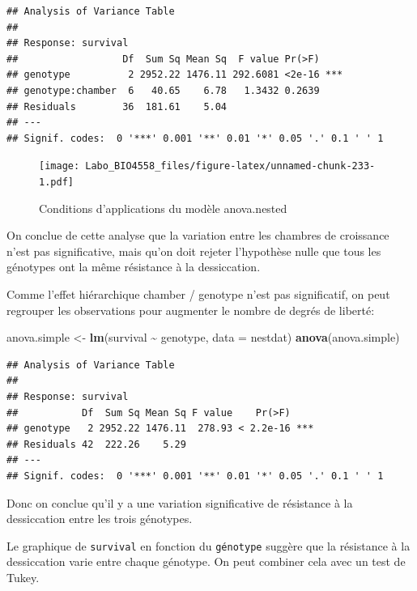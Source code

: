 \documentclass[
  12pt,
]{book}
\newenvironment{Shaded}{\begin{snugshade}}{\end{snugshade}}
\newcommand{\DataTypeTok}[1]{\textcolor[rgb]{0.13,0.29,0.53}{#1}}
\newcommand{\KeywordTok}[1]{\textcolor[rgb]{0.13,0.29,0.53}{\textbf{#1}}}
\newcommand{\NormalTok}[1]{#1}
\newcommand{\OperatorTok}[1]{\textcolor[rgb]{0.81,0.36,0.00}{\textbf{#1}}}
\newcommand{\StringTok}[1]{\textcolor[rgb]{0.31,0.60,0.02}{#1}}
\begin{document}
\begin{verbatim}
## Analysis of Variance Table
## 
## Response: survival
##                  Df  Sum Sq Mean Sq  F value Pr(>F)    
## genotype          2 2952.22 1476.11 292.6081 <2e-16 ***
## genotype:chamber  6   40.65    6.78   1.3432 0.2639    
## Residuals        36  181.61    5.04                    
## ---
## Signif. codes:  0 '***' 0.001 '**' 0.01 '*' 0.05 '.' 0.1 ' ' 1
\end{verbatim}

\begin{figure}
\centering
\texttt{[image: Labo\_BIO4558\_files/figure-latex/unnamed-chunk-233-1.pdf]}
\caption{\label{fig:unnamed-chunk-233}Conditions d'applications du modèle anova.nested}
\end{figure}

On conclue de cette analyse que la variation entre les chambres de croissance n'est pas significative, mais qu'on doit rejeter l'hypothèse nulle que tous les génotypes ont la même résistance à la dessiccation.

Comme l'effet hiérarchique chamber / genotype n'est pas significatif, on peut regrouper les observations pour augmenter le nombre de degrés de liberté:

\begin{Shaded}
\begin{Highlighting}[]
\NormalTok{anova.simple \textless{}{-}}\StringTok{ }\KeywordTok{lm}\NormalTok{(survival }\OperatorTok{\textasciitilde{}}\StringTok{ }\NormalTok{genotype, }\DataTypeTok{data =}\NormalTok{ nestdat)}
\KeywordTok{anova}\NormalTok{(anova.simple)}
\end{Highlighting}
\end{Shaded}

\begin{verbatim}
## Analysis of Variance Table
## 
## Response: survival
##           Df  Sum Sq Mean Sq F value    Pr(>F)    
## genotype   2 2952.22 1476.11  278.93 < 2.2e-16 ***
## Residuals 42  222.26    5.29                      
## ---
## Signif. codes:  0 '***' 0.001 '**' 0.01 '*' 0.05 '.' 0.1 ' ' 1
\end{verbatim}

Donc on conclue qu'il y a une variation significative de résistance à la dessiccation entre les trois génotypes.

Le graphique de \texttt{survival} en fonction du \texttt{génotype} suggère que la résistance à la dessiccation varie entre chaque génotype. On peut combiner cela avec un test de Tukey.
\end{document}
